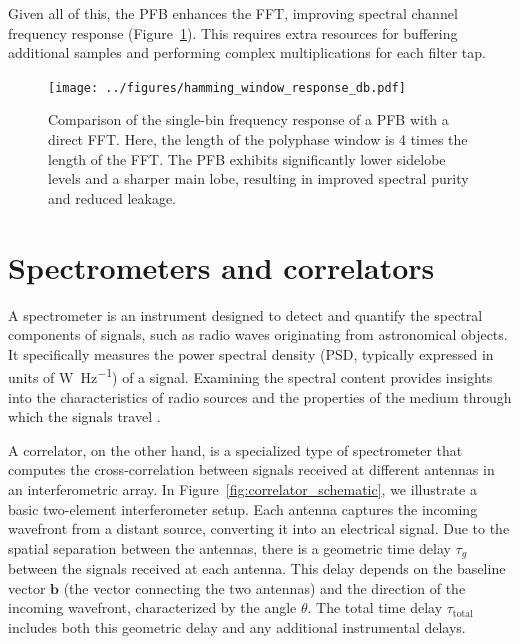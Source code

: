 Given all of this, the PFB enhances the FFT, improving spectral channel frequency response (Figure~\ref{fig:hamming_window_response}). This requires extra resources for buffering additional samples and performing complex multiplications for each filter tap.

\begin{figure}
	\centering
	\texttt{[image: ../figures/hamming\_window\_response\_db.pdf]}
	\caption[Comparison of single-bin frequency response between PFB and FFT]{Comparison of the single-bin frequency response of a PFB with a direct FFT. Here, the length of the polyphase window is 4 times the length of the FFT. The PFB exhibits significantly lower sidelobe levels and a sharper main lobe, resulting in improved spectral purity and reduced leakage.}
	\label{fig:hamming_window_response}
\end{figure}

\section{Spectrometers and correlators}
A spectrometer is an instrument designed to detect and quantify the spectral components of signals, such as radio waves originating from astronomical objects. It specifically measures the power spectral density (PSD, typically expressed in units of \si{\watt \per \hertz}) of a signal. Examining the spectral content provides insights into the characteristics of radio sources and the properties of the medium through which the signals travel \citep{Price2016spectrometers}.

A correlator, on the other hand, is a specialized type of spectrometer that computes the cross-correlation between signals received at different antennas in an interferometric array. In Figure~\ref{fig:correlator_schematic}, we illustrate a basic two-element interferometer setup. Each antenna captures the incoming wavefront from a distant source, converting it into an electrical signal. Due to the spatial separation between the antennas, there is a geometric time delay $\tau_g$ between the signals received at each antenna. This delay depends on the baseline vector $\mathbf{b}$ (the vector connecting the two antennas) and the direction of the incoming wavefront, characterized by the angle $\theta$. The total time delay $\tau_\text{total}$ includes both this geometric delay and any additional instrumental delays.
 

